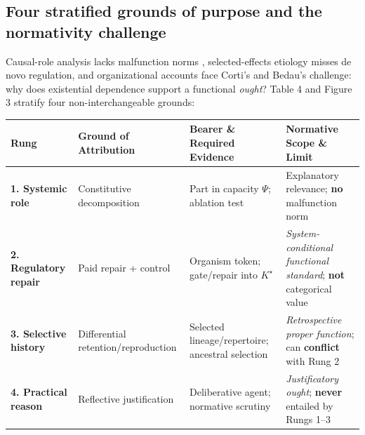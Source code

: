 \documentclass[11pt,letterpaper]{article}
\newcounter{none}
\begin{document}
\subsection{Four stratified grounds of purpose and the normativity
challenge}\label{four-stratified-grounds-of-purpose-and-the-normativity-challenge}

Causal-role analysis \citep{cummins1975} lacks malfunction norms
\citep{davies2001}, selected-effects etiology
\citep{wright1973, millikan1984, neander1991, godfreySmith1994} misses
de novo regulation, and organizational accounts
\citep{mossio2009, bich2024} face Corti's \citeyearpar[§3]{corti2023}
and Bedau's \citeyearpar{bedau1992} challenge: why does existential
dependence support a functional \emph{ought}? Table 4 and Figure 3
stratify four non-interchangeable grounds:


{\def\LTcaptype{none} %
\begin{longtable}[]{@{}
  >{\raggedright\arraybackslash}p{}
  >{\raggedright\arraybackslash}p{}
  >{\raggedright\arraybackslash}p{}
  >{\raggedright\arraybackslash}p{}@{}}
\toprule\noalign{}
\begin{minipage}[b]{\linewidth}\raggedright
Rung
\end{minipage} & \begin{minipage}[b]{\linewidth}\raggedright
Ground of Attribution
\end{minipage} & \begin{minipage}[b]{\linewidth}\raggedright
Bearer \& Required Evidence
\end{minipage} & \begin{minipage}[b]{\linewidth}\raggedright
Normative Scope \& Limit
\end{minipage} \\
\midrule\noalign{}
\endhead
\bottomrule\noalign{}
\endlastfoot
\textbf{1. Systemic role} & Constitutive decomposition
\citep{cummins1975, craver2007} & Part in capacity \(\Psi\); ablation
test & Explanatory relevance; \textbf{no} malfunction norm
\citep{davies2001} \\
\textbf{2. Regulatory repair} & Paid repair + control
\citep{nagel1977, mossio2009, diPaolo2005, bich2024} & Organism token;
gate/repair into \(K^\star\) & \emph{System-conditional functional
standard}; \textbf{not} categorical value \\
\textbf{3. Selective history} & Differential retention/reproduction
\citep{wright1973, millikan1984, garson2019} & Selected
lineage/repertoire; ancestral selection & \emph{Retrospective proper
function}; can \textbf{conflict} with Rung 2 \\
\textbf{4. Practical reason} & Reflective justification
\citep{korsgaard1996, scanlon1998, list2019} & Deliberative agent;
normative scrutiny & \emph{Justificatory ought}; \textbf{never} entailed
by Rungs 1--3 \citep{street2006} \\
\end{longtable}
}
\end{document}
